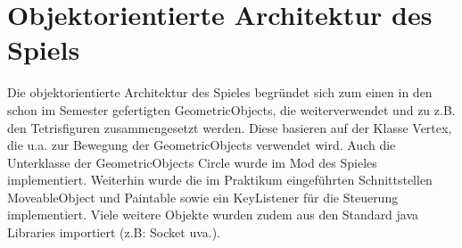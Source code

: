 \documentclass[10pt,a4paper,titlepage]{article}
\begin{document}
\section{Objektorientierte Architektur des Spiels}

Die objektorientierte Architektur des Spieles begründet sich zum einen in den schon im
Semester gefertigten GeometricObjects, die weiterverwendet und zu z.B. den Tetrisfiguren
zusammengesetzt werden.
Diese basieren auf der Klasse Vertex, die u.a. zur Bewegung der GeometricObjects
verwendet wird.
Auch die Unterklasse der GeometricObjects Circle wurde im Mod des Spieles
implementiert.
Weiterhin wurde die im Praktikum eingeführten Schnittstellen MoveableObject und
Paintable sowie ein KeyListener für die Steuerung implementiert.
Viele weitere Objekte wurden zudem aus den Standard java Libraries importiert (z.B:
Socket uva.).
\end{document}
